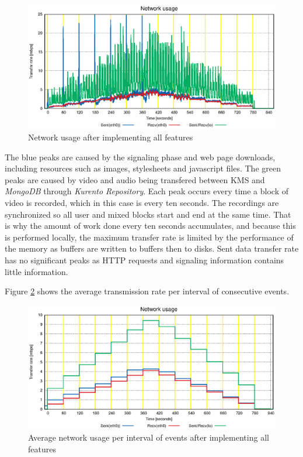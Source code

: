 \begin{figure}
  \centering
  \includegraphics[width=\textwidth]{stats/test_full_features_net.eps}
  \caption{Network usage after implementing all features}
  \label{fig:test_full_features_net}
\end{figure}


      The blue peaks are caused by the signaling phase and web page downloads, including resources such as images, stylesheets and javascript files. 
      The green peaks are caused by video and audio being transfered between \ac{KMS} and \emph{MongoDB} through \emph{Kurento Repository}. Each peak occurs every time a block of video is recorded, which in this case is every ten seconds. 
      The recordings are synchronized so all user and mixed blocks start and end at the same time. That is why the amount of work done every ten seconds accumulates, and because this is performed locally, the maximum transfer rate is limited by the performance of the memory as buffers are written to buffers then to disks. 
      Sent data transfer rate has no significant peaks as \ac{HTTP} requests and signaling information contains little information.

      Figure \ref{fig:summary_full_net} shows the average transmission rate per interval of consecutive events. 


\begin{figure}
  \centering
  \includegraphics[width=\textwidth]{stats/summary_full_net.eps}
  \caption{Average network usage per interval of events after implementing all features}
  \label{fig:summary_full_net}
\end{figure}



